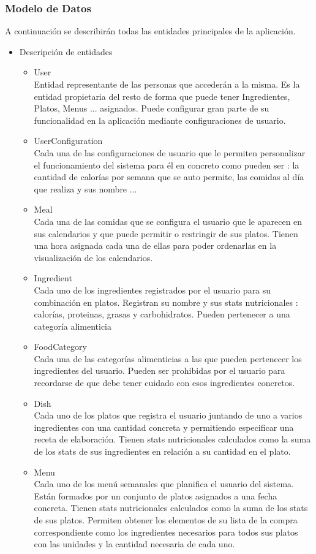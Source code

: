 \documentclass[12pt, a4paper, twoside]{book}
\begin{document}
	\subsubsection{Modelo de Datos}
	A continuación se describirán todas las entidades principales de la aplicación.
	\begin{itemize}
		\item Descripción de entidades
		\begin{itemize}
			\item User \\Entidad representante de las personas que accederán a la misma. Es la entidad propietaria del resto de forma que puede tener Ingredientes, Platos, Menus ... asignados. Puede configurar gran parte de su funcionalidad en la aplicación mediante configuraciones de usuario.
			\item UserConfiguration \\ Cada una de las configuraciones de usuario que le permiten personalizar el funcionamiento del sistema para él en concreto como pueden ser : la cantidad de calorías por semana que se auto permite, las comidas al día que realiza y sus nombre ...
			\item Meal \\ Cada una de las comidas que se configura el usuario que le aparecen en sus calendarios y que puede permitir o restringir de sus platos. Tienen una hora asignada cada una de ellas para poder ordenarlas en la visualización de los calendarios.
			\item Ingredient \\ Cada uno de los ingredientes registrados por el usuario para su combinación en platos. Registran su nombre y sus stats nutricionales : calorías, proteinas, grasas y carbohidratos. Pueden pertenecer a una categoría alimenticia
			\item FoodCategory \\ Cada una de las categorías alimenticias a las que pueden pertenecer los ingredientes del usuario. Pueden ser prohibidas por el usuario para recordarse de que debe tener cuidado con esos ingredientes concretos.
			\item Dish \\ Cada uno de los platos que registra el usuario juntando de uno a varios ingredientes con una cantidad concreta y permitiendo especificar una receta de elaboración. Tienen stats nutricionales calculados como la suma de los stats de sus ingredientes en relación a su cantidad en el plato.
			\item Menu \\ Cada uno de los menú semanales que planifica el usuario del sistema. Están formados por un conjunto de platos asignados a una fecha concreta. Tienen stats nutricionales calculados como la suma de los stats de sus platos. Permiten obtener los elementos de su lista de la compra correspondiente como los ingredientes necesarios para todos sus platos con las unidades y la cantidad necesaria de cada uno.

\end{itemize}
\end{itemize}
\end{document}
